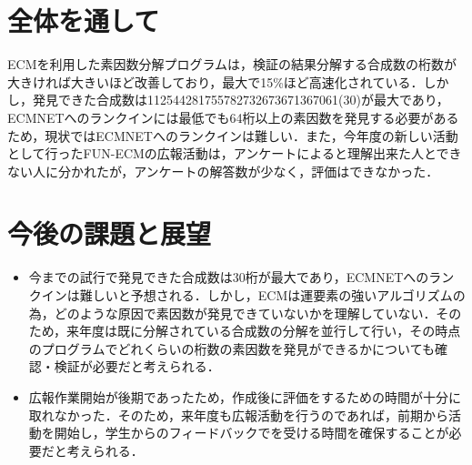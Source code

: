 \documentclass[openany,11pt,papersize]{jsbook}
\begin{document}
\section{全体を通して}
ECMを利用した素因数分解プログラムは，検証の結果分解する合成数の桁数が大きければ大きいほど改善しており，最大で15\%ほど高速化されている．しかし，発見できた合成数は112544281755782732673671367061(30)が最大であり，ECMNETへのランクインには最低でも64桁以上の素因数を発見する必要があるため，現状ではECMNETへのランクインは難しい．また，今年度の新しい活動として行ったFUN-ECMの広報活動は，アンケートによると理解出来た人とできない人に分かれたが，アンケートの解答数が少なく，評価はできなかった．

\section{今後の課題と展望}
\begin{itemize}
\item 今までの試行で発見できた合成数は30桁が最大であり，ECMNETへのランクインは難しいと予想される．しかし，ECMは運要素の強いアルゴリズムの為，どのような原因で素因数が発見できていないかを理解していない．そのため，来年度は既に分解されている合成数の分解を並行して行い，その時点のプログラムでどれくらいの桁数の素因数を発見ができるかについても確認・検証が必要だと考えられる．
\item 広報作業開始が後期であったため，作成後に評価をするための時間が十分に取れなかった．そのため，来年度も広報活動を行うのであれば，前期から活動を開始し，学生からのフィードバックでを受ける時間を確保することが必要だと考えられる．
\end{itemize}

\end{document}
